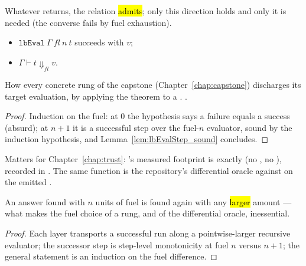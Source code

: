\begin{theorem}
\label{thm:lbEval_sound}
\leanok
{}
 Whatever  returns, the relation \hl{admits}; only this direction holds and only it is needed (the converse fails by fuel exhaustion).
\begin{itemize}
\item {} $\mathtt{lbEval}\ \Gamma\ fl\ n\ t$ succeeds with $v$;
\item {} $\Gamma \vdash t \Downarrow_{fl} v$.
\end{itemize}
 How every concrete rung of the capstone (Chapter~\ref{chap:capstone}) discharges its target evaluation, by applying the theorem to a .
 \stProved{}.
\end{theorem}
\begin{proof}
\leanok
{}
 Induction on the fuel: at $0$ the hypothesis says a failure equals a success (absurd); at $n+1$ it is a successful step over the fuel-$n$ evaluator, sound by the induction hypothesis, and Lemma~\ref{lem:lbEvalStep_sound} concludes.
\end{proof}

\begin{remark}
 Matters for Chapter~\ref{chap:trust}: 's measured footprint is exactly \code{[propext]} (no , no ), recorded in . The same function is the repository's differential oracle against  on the emitted .
\end{remark}

\begin{lemma}
\label{lem:lbEval_mono}
\leanok
{}
 An answer found with $n$ units of fuel is found again with any \hl{larger} amount --- what makes the fuel choice of a rung, and of the differential oracle, inessential.
\end{lemma}
\begin{proof}
\leanok
{}
 Each layer transports a successful run along a pointwise-larger recursive evaluator; the successor step is step-level monotonicity at fuel $n$ versus $n+1$; the general statement is an induction on the fuel difference.
\end{proof}

